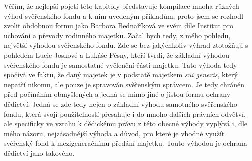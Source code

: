 \documentclass{article}
\begin{document}
 Věřím, že nejlepší pojetí této kapitoly představuje kompilace mnoha různých výhod svěřenského fondu a k nim uvedeným příkladům, proto jsem se rozhodl zvolit obdobnou formu jako Barbora Bednaříková ve svém díle Institut pro uchování a převody rodinného majetku. Začal bych tedy, z mého pohledu, největší výhodou svěřenského fondu. Zde se bez jakýchkoliv výhrad ztotožňuji s pohledem Lucie Joskové a Lukáše Pěsny, kteří tvrdí, že základní výhodou svěřenského fondu je samostatné vyčlenění části majetku. Tato výhoda tedy spočívá ve faktu, že daný majetek je v podstatě majetkem \textit{sui generis}, který nepatří nikomu, ale pouze je spravován svěřenským správcem. Je tedy chráněn před počínáním obmyšlených a jedná se mimo jiné o jistou formu ochrany dědictví. Jedná se zde tedy nejen o základní výhodu samotného svěřenského fondu, která svojí použitelností přesahuje i do mnoho dalších právních odvětví, ale specificky ve vztahu k dědickému právu z této obecné výhody vyplývá i, dle mého názoru, nejzásadnější výhoda a důvod, pro které je vhodné využít svěřenský fond k mezigeneračnímu předání majetku. Touto výhodou je ochrana dědictví jako takového.\\

 
 
 
 
 
\end{document}
